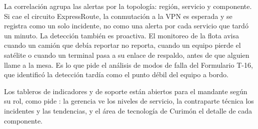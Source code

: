 La correlación agrupa las alertas por la topología: región, servicio y componente. Si cae el circuito
ExpressRoute, la conmutación a la VPN es esperada y se registra como un solo incidente, no como una
alerta por cada servicio que tardó un minuto. La detección también es proactiva. El monitoreo de la
flota avisa cuando un camión que debía reportar no reporta, cuando un equipo pierde el satélite o cuando
un terminal pasa a su enlace de respaldo, antes de que alguien llame a la mesa. Es lo que pide el
análisis de modos de falla del Formulario T-16, que identificó la detección tardía como el punto débil
del equipo a bordo.

Los tableros de indicadores y de soporte están abiertos para el mandante según su rol, como pide
: la gerencia ve los niveles de servicio, la contraparte técnica los incidentes y
las tendencias, y el área de tecnología de Curimón el detalle de cada componente.
